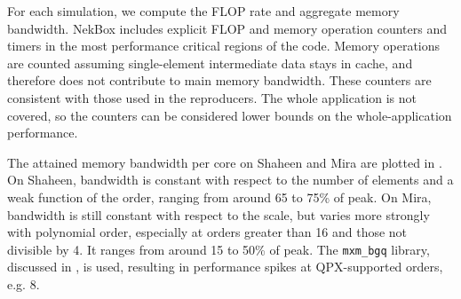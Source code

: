 For each simulation, we compute the FLOP rate and aggregate memory bandwidth.
NekBox includes explicit FLOP and memory operation counters and timers in the most performance critical regions of the code.
Memory operations are counted assuming single-element intermediate data stays in cache, and therefore does not contribute to main memory bandwidth.
These counters are consistent with those used in the reproducers.
The whole application is not covered, so the counters can be considered lower bounds on the whole-application performance.

The attained memory bandwidth per core on Shaheen and Mira are plotted in .
On Shaheen, bandwidth is constant with respect to the number of elements and a weak function of the order, ranging from around 65 to 75\% of peak.
On Mira, bandwidth is still constant with respect to the scale, but varies more strongly with polynomial order, especially at orders greater than 16 and those not divisible by 4.
It ranges from around 15 to 50\% of peak.
The \texttt{mxm\_bgq} library, discussed in , is used, resulting in performance spikes at QPX-supported orders, e.g. 8.

